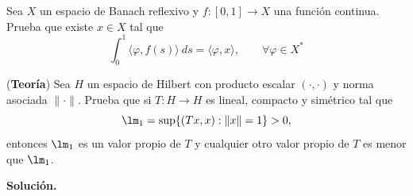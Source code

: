 \documentclass[12pt]{article}
\begin{document}
    \begin{ejercicio}
        Sea $X$ un espacio de Banach reflexivo y $f:[0,1]\to X$ una función continua. Prueba que existe $x\in X$ tal que
        \begin{equation*}
            \int_{0}^{1} \langle \varphi,f(s) \rangle ~ds  = \langle \varphi,x \rangle , \qquad \forall \varphi \in X^\ast
        \end{equation*}
    \end{ejercicio}

    \begin{ejercicio}
        (\textbf{Teoría}) Sea $H$ un espacio de Hilbert con producto escalar $(\cdot ,\cdot )$ y norma asociada $\|\cdot \|$. Prueba que si $T:H\to H$ es lineal, compacto y simétrico tal que
        \begin{equation*}
            \lm_1 = \sup\{(Tx,x):\|x\| = 1\} > 0,
        \end{equation*}
        entonces $\lm_1$ es un valor propio de $T$ y cualquier otro valor propio de $T$ es menor que $\lm_1$.
    \end{ejercicio}

    \newpage
    \setcounter{ejercicio}{0}
    \noindent
    \textbf{Solución.}
    
\end{document}
